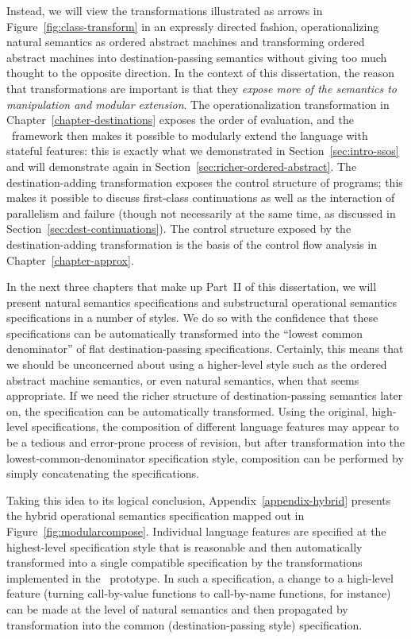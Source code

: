Instead, we will view the transformations illustrated as arrows in
Figure~\ref{fig:class-transform} in an expressly directed fashion,
operationalizing natural semantics as ordered abstract machines and
transforming ordered abstract machines into destination-passing
semantics without giving too much thought to the opposite
direction. In the context of this dissertation, the reason that
transformations are important is that they {\it expose more of the
  semantics to manipulation and modular extension}.  The
operationalization transformation in Chapter~\ref{chapter-destinations} 
exposes the order of
evaluation, and the \sls~framework then makes it possible to modularly
extend the language with stateful features: this is exactly what we
demonstrated in Section~\ref{sec:intro-ssos} and will
demonstrate again in Section~\ref{sec:richer-ordered-abstract}.  The
destination-adding transformation exposes the control structure of
programs; this makes it possible to discuss first-class continuations
as well as the interaction of parallelism and failure (though not
necessarily at the same time, as discussed in
Section~\ref{sec:dest-continuations}).  The control structure exposed
by the destination-adding transformation is the basis of the control
flow analysis in Chapter~\ref{chapter-approx}.

In the next three chapters that make up Part~II of this dissertation,
we will present natural semantics specifications and substructural
operational semantics specifications in a number of styles. We do so
with the confidence that these specifications can be automatically
transformed into the ``lowest common denominator'' of flat
destination-passing specifications.  Certainly, this means that we
should be unconcerned about using a higher-level style such as the
ordered abstract machine semantics, or even natural semantics, when
that seems appropriate. If we need the richer structure of
destination-passing semantics later on, the specification can be
automatically transformed.  Using the original, high-level
specifications, the composition of different language features may
appear to be a tedious and error-prone process of revision, but after
transformation into the lowest-common-denominator specification style,
composition can be performed by simply concatenating the
specifications.

Taking this idea to its logical conclusion,
Appendix~\ref{appendix-hybrid} presents the hybrid operational
semantics specification mapped out in
Figure~\ref{fig:modularcompose}. Individual language features are
specified at the highest-level specification style that is reasonable
and then automatically transformed into a single compatible
specification by the transformations implemented in the
\sls~prototype. In such a specification, a change to a high-level
feature (turning call-by-value functions to call-by-name functions,
for instance) can be made at the level of natural semantics and
then propagated by transformation into the common (destination-passing
style) specification.



